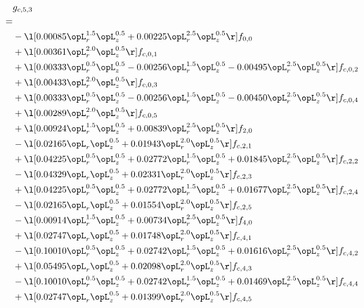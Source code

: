 \begin{alignat}{2} 
\label{eq:g_53_0} 
& g_{c,5,3} \nonumber \\ 
 = \\ 
& - \l[  0.00085 \opL_r^{1.5} \opL_z^{0.5} +  0.00225 \opL_r^{2.5} \opL_z^{0.5}  \r] f_{0,0} \nonumber \\ 
& + \l[  0.00361 \opL_r^{2.0} \opL_z^{0.5}  \r] f_{c,0,1} \nonumber \\ 
& + \l[  0.00333 \opL_r^{0.5} \opL_z^{0.5}   -0.00256 \opL_r^{1.5} \opL_z^{0.5}   -0.00495 \opL_r^{2.5} \opL_z^{0.5}  \r] f_{c,0,2} \nonumber \\ 
& + \l[  0.00433 \opL_r^{2.0} \opL_z^{0.5}  \r] f_{c,0,3} \nonumber \\ 
& + \l[  0.00333 \opL_r^{0.5} \opL_z^{0.5}   -0.00256 \opL_r^{1.5} \opL_z^{0.5}   -0.00450 \opL_r^{2.5} \opL_z^{0.5}  \r] f_{c,0,4} \nonumber \\ 
& + \l[  0.00289 \opL_r^{2.0} \opL_z^{0.5}  \r] f_{c,0,5} \nonumber \\ 
& + \l[  0.00924 \opL_r^{1.5} \opL_z^{0.5} +  0.00839 \opL_r^{2.5} \opL_z^{0.5}  \r] f_{2,0} \nonumber \\ 
& - \l[  0.02165 \opL_r \opL_z^{0.5} +  0.01943 \opL_r^{2.0} \opL_z^{0.5}  \r] f_{c,2,1} \nonumber \\ 
& + \l[  0.04225 \opL_r^{0.5} \opL_z^{0.5} +  0.02772 \opL_r^{1.5} \opL_z^{0.5} +  0.01845 \opL_r^{2.5} \opL_z^{0.5}  \r] f_{c,2,2} \nonumber \\ 
& - \l[  0.04329 \opL_r \opL_z^{0.5} +  0.02331 \opL_r^{2.0} \opL_z^{0.5}  \r] f_{c,2,3} \nonumber \\ 
& + \l[  0.04225 \opL_r^{0.5} \opL_z^{0.5} +  0.02772 \opL_r^{1.5} \opL_z^{0.5} +  0.01677 \opL_r^{2.5} \opL_z^{0.5}  \r] f_{c,2,4} \nonumber \\ 
& - \l[  0.02165 \opL_r \opL_z^{0.5} +  0.01554 \opL_r^{2.0} \opL_z^{0.5}  \r] f_{c,2,5} \nonumber \\ 
& - \l[  0.00914 \opL_r^{1.5} \opL_z^{0.5} +  0.00734 \opL_r^{2.5} \opL_z^{0.5}  \r] f_{4,0} \nonumber \\ 
& + \l[  0.02747 \opL_r \opL_z^{0.5} +  0.01748 \opL_r^{2.0} \opL_z^{0.5}  \r] f_{c,4,1} \nonumber \\ 
& - \l[  0.10010 \opL_r^{0.5} \opL_z^{0.5} +  0.02742 \opL_r^{1.5} \opL_z^{0.5} +  0.01616 \opL_r^{2.5} \opL_z^{0.5}  \r] f_{c,4,2} \nonumber \\ 
& + \l[  0.05495 \opL_r \opL_z^{0.5} +  0.02098 \opL_r^{2.0} \opL_z^{0.5}  \r] f_{c,4,3} \nonumber \\ 
& - \l[  0.10010 \opL_r^{0.5} \opL_z^{0.5} +  0.02742 \opL_r^{1.5} \opL_z^{0.5} +  0.01469 \opL_r^{2.5} \opL_z^{0.5}  \r] f_{c,4,4} \nonumber \\ 
& + \l[  0.02747 \opL_r \opL_z^{0.5} +  0.01399 \opL_r^{2.0} \opL_z^{0.5}  \r] f_{c,4,5} \nonumber \\ 
\end{alignat} 



